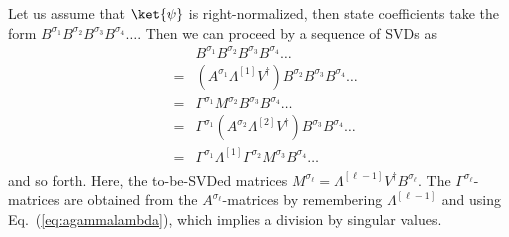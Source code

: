 Let us assume that $\ket{\psi}$ is right-normalized, then state coefficients take the form $B^{\sigma_1}B^{\sigma_2}B^{\sigma_3}B^{\sigma_4}\ldots$. Then we can proceed by a sequence of SVDs as
\begin{eqnarray*}
& & B^{\sigma_1}B^{\sigma_2}B^{\sigma_3}B^{\sigma_4} \ldots \\
&=& (A^{\sigma_1} \Lambda^{[1]} V^\dagger) B^{\sigma_2}B^{\sigma_3}B^{\sigma_4} \ldots \\
&=& \Gamma^{\sigma_1} M^{\sigma_2} B^{\sigma_3}B^{\sigma_4} \ldots \\
&=& \Gamma^{\sigma_1} (A^{\sigma_2}  \Lambda^{[2]} V^\dagger) B^{\sigma_3}B^{\sigma_4} \ldots \\
&=& \Gamma^{\sigma_1} \Lambda^{[1]} \Gamma^{\sigma_2} M^{\sigma_3} B^{\sigma_4} \ldots \\
\end{eqnarray*} 
and so forth. Here, the to-be-SVDed matrices $M^{\sigma_\ell} = \Lambda^{[\ell-1]} V^\dagger B^{\sigma_\ell}$. The $\Gamma^{\sigma_\ell}$-matrices are obtained from the $A^{\sigma_\ell}$-matrices by remembering $\Lambda^{[\ell-1]}$ and using Eq.~(\ref{eq:agammalambda}), which implies a division by singular values.

